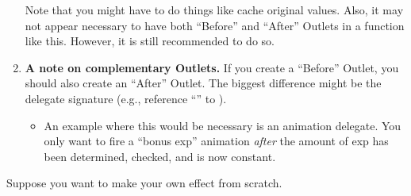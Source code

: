 \begin{enumerate}
{\begin{center}
	\end{center}
	Note that you might have to do things like cache original values. Also, it may not appear necessary to have both ``Before'' and ``After'' Outlets in a function like this. However, it is still recommended to do so.
	}
	\item{\textbf{A note on complementary Outlets.} If you create a ``Before'' Outlet, you should also create an ``After'' Outlet. The biggest difference might be the delegate signature (e.g., reference ``\code{\&}'' to ).
		\begin{itemize}
			\item{An example where this would be necessary is an animation delegate. You only want to fire a ``bonus exp'' animation \textit{after} the amount of exp has been determined, checked, and is now constant.}
		\end{itemize}
	}
\end{enumerate}


Suppose you want to make your own effect from scratch. 

